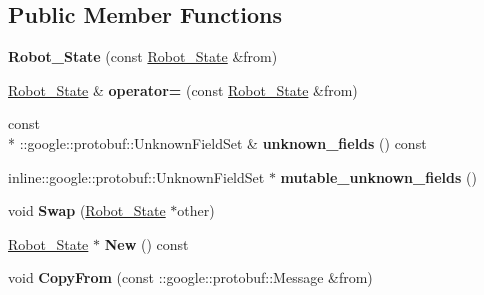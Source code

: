 \subsection*{Public Member Functions}
\begin{DoxyCompactItemize}
\item 
\hypertarget{classvss__state_1_1Robot__State_a067b968ee504ea53efd93d9aa27c96ca}{{\bfseries Robot\-\_\-\-State} (const \hyperlink{classvss__state_1_1Robot__State}{Robot\-\_\-\-State} \&from)}\label{classvss__state_1_1Robot__State_a067b968ee504ea53efd93d9aa27c96ca}

\item 
\hypertarget{classvss__state_1_1Robot__State_ad37aa84870eea581e0406cfb5db502ac}{\hyperlink{classvss__state_1_1Robot__State}{Robot\-\_\-\-State} \& {\bfseries operator=} (const \hyperlink{classvss__state_1_1Robot__State}{Robot\-\_\-\-State} \&from)}\label{classvss__state_1_1Robot__State_ad37aa84870eea581e0406cfb5db502ac}

\item 
\hypertarget{classvss__state_1_1Robot__State_a12a57833a931bfb941527d777fb1d99a}{const \\*
\-::google\-::protobuf\-::\-Unknown\-Field\-Set \& {\bfseries unknown\-\_\-fields} () const }\label{classvss__state_1_1Robot__State_a12a57833a931bfb941527d777fb1d99a}

\item 
\hypertarget{classvss__state_1_1Robot__State_adda3db07f10ebdb69699bb992976ace3}{inline\-::google\-::protobuf\-::\-Unknown\-Field\-Set $\ast$ {\bfseries mutable\-\_\-unknown\-\_\-fields} ()}\label{classvss__state_1_1Robot__State_adda3db07f10ebdb69699bb992976ace3}

\item 
\hypertarget{classvss__state_1_1Robot__State_a4f0475b13ab71a00c88f4662e82decea}{void {\bfseries Swap} (\hyperlink{classvss__state_1_1Robot__State}{Robot\-\_\-\-State} $\ast$other)}\label{classvss__state_1_1Robot__State_a4f0475b13ab71a00c88f4662e82decea}

\item 
\hypertarget{classvss__state_1_1Robot__State_a1ae61a4d15e74bd8210d8943b4cb4d93}{\hyperlink{classvss__state_1_1Robot__State}{Robot\-\_\-\-State} $\ast$ {\bfseries New} () const }\label{classvss__state_1_1Robot__State_a1ae61a4d15e74bd8210d8943b4cb4d93}

\item 
\hypertarget{classvss__state_1_1Robot__State_ad8ff7bd295e28703ef3b6bdc6dba1435}{void {\bfseries Copy\-From} (const \-::google\-::protobuf\-::\-Message \&from)}\label{classvss__state_1_1Robot__State_ad8ff7bd295e28703ef3b6bdc6dba1435}


\end{DoxyCompactItemize}
